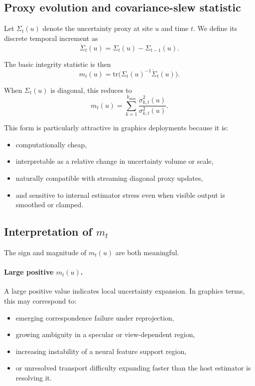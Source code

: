 \documentclass[11pt]{article}
\theoremstyle{definition}
\theoremstyle{plain}
\begin{document}

\subsection{Proxy evolution and covariance-slew statistic}

Let $\Sigma_t(u)$ denote the uncertainty proxy at site $u$ and time $t$. We define its discrete temporal increment as
\begin{equation}
\dot{\Sigma}_t(u)=\Sigma_t(u)-\Sigma_{t-1}(u).
\end{equation}

The basic integrity statistic is then
\begin{equation}
m_t(u)=\mathrm{tr}\!\bigl(\Sigma_t(u)^{-1}\dot{\Sigma}_t(u)\bigr).
\end{equation}

When $\Sigma_t(u)$ is diagonal, this reduces to
\begin{equation}
m_t(u)=\sum_{k=1}^{k_{\max}} \frac{\dot{\sigma}^{2}_{k,t}(u)}{\sigma^{2}_{k,t}(u)}.
\end{equation}

This form is particularly attractive in graphics deployments because it is:
\begin{itemize}[leftmargin=1.5em]
    \item computationally cheap,
    \item interpretable as a relative change in uncertainty volume or scale,
    \item naturally compatible with streaming diagonal proxy updates,
    \item and sensitive to internal estimator stress even when visible output is smoothed or clamped.
\end{itemize}


\subsection{Interpretation of $m_t$}

The sign and magnitude of $m_t(u)$ are both meaningful.

\paragraph{Large positive $m_t(u)$.}
A large positive value indicates local uncertainty expansion. In graphics terms, this may correspond to:
\begin{itemize}[leftmargin=1.5em]
    \item emerging correspondence failure under reprojection,
    \item growing ambiguity in a specular or view-dependent region,
    \item increasing instability of a neural feature support region,
    \item or unresolved transport difficulty expanding faster than the host estimator is resolving it.
\end{itemize}
\end{document}
